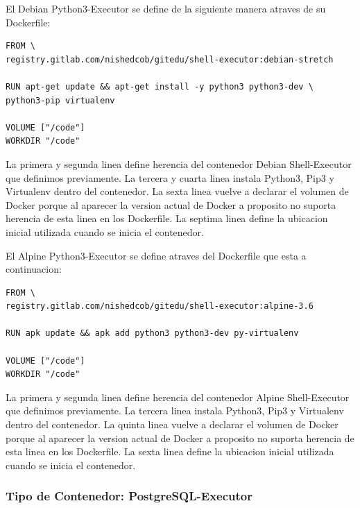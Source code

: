 El Debian Python3-Executor se define de la siguiente manera atraves de su Dockerfile:
\begin{lstlisting}
FROM \
registry.gitlab.com/nishedcob/gitedu/shell-executor:debian-stretch

RUN apt-get update && apt-get install -y python3 python3-dev \
python3-pip virtualenv

VOLUME ["/code"]
WORKDIR "/code"
\end{lstlisting}
La primera y segunda linea define herencia del contenedor Debian Shell-Executor que definimos previamente. La tercera y cuarta linea instala Python3, Pip3 y Virtualenv dentro del contenedor. La sexta linea vuelve a declarar el volumen de Docker porque al aparecer la version actual de Docker a proposito no suporta herencia de esta linea en los Dockerfile. La septima linea define la ubicacion inicial utilizada cuando se inicia el contenedor.

El Alpine Python3-Executor se define atraves del Dockerfile que esta a continuacion:
\begin{lstlisting}
FROM \
registry.gitlab.com/nishedcob/gitedu/shell-executor:alpine-3.6

RUN apk update && apk add python3 python3-dev py-virtualenv

VOLUME ["/code"]
WORKDIR "/code"
\end{lstlisting}
La primera y segunda linea define herencia del contenedor Alpine Shell-Executor que definimos previamente. La tercera linea instala Python3, Pip3 y Virtualenv dentro del contenedor. La quinta linea vuelve a declarar el volumen de Docker porque al aparecer la version actual de Docker a proposito no suporta herencia de esta linea en los Dockerfile. La sexta linea define la ubicacion inicial utilizada cuando se inicia el contenedor.

\subsubsection{Tipo de Contenedor: PostgreSQL-Executor}


